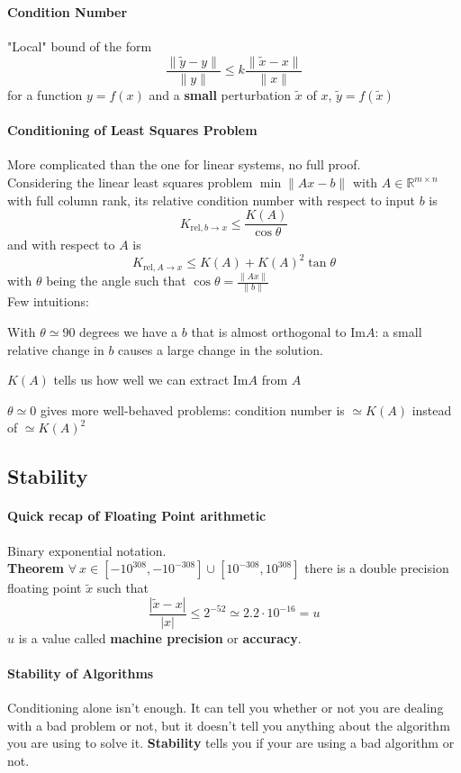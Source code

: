 \documentclass[10pt]{report}
\begin{document}
\paragraph{Condition Number} "Local" bound of the form $$\frac{\|\tilde{y} - y\|}{\|y\|} \leq k\frac{\|\tilde{x} - x\|}{\|x\|}$$ for a function $y=f(x)$ and a \textbf{small} perturbation $\tilde{x}$ of $x$, $\tilde{y} = f(\tilde{x})$
\paragraph{Conditioning of Least Squares Problem} More complicated than the one for linear systems, no full proof.\\
Considering the linear least squares problem $\min\|Ax-b\|$ with $A\in\mathbb{R}^{m\times n}$ with full column rank, its relative condition number with respect to input $b$ is $$K_{\text{rel}, b\to x}\leq\frac{K(A)}{\cos\theta}$$ and with respect to $A$ is $$K_{\text{rel}, A\to x}\leq K(A)+K(A)^2\tan\theta$$ with $\theta$ being the angle such that $\cos\theta=\frac{\|Ax\|}{\|b\|}$\\
Few intuitions:\begin{list}{}{}
	\item With $\theta\simeq 90$ degrees we have a $b$ that is almost orthogonal to $\text{Im}A$: a small relative change in $b$ causes a large change in the solution.
	\item $K(A)$ tells us how well we can extract $\text{Im}A$ from $A$
	\item $\theta\simeq 0$ gives more well-behaved problems: condition number is $\simeq K(A)$ instead of $\simeq K(A)^2$
\end{list}
\subsection{Stability}
\paragraph{Quick recap of Floating Point arithmetic} Binary exponential notation.\\
\textbf{Theorem} $\forall\:x\in[-10^{308},-10^{-308}]\cup[10^{-308},10^{308}]$ there is a double precision floating point $\tilde{x}$ such that $$\frac{|\tilde{x} - x|}{|x|}\leq 2^{-52} \simeq 2.2\cdot10^{-16}=u$$
$u$ is a value called \textbf{machine precision} or \textbf{accuracy}.
\paragraph{Stability of Algorithms} Conditioning alone isn't enough. It can tell you whether or not you are dealing with a bad problem or not, but it doesn't tell you anything about the algorithm you are using to solve it. \textbf{Stability} tells you if your are using a bad algorithm or not.
\end{document}
